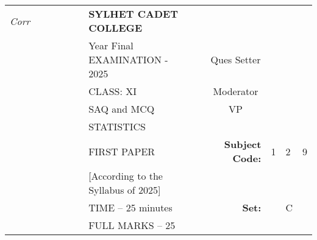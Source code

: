 \documentclass[12pt]{exam}
\begin{document}
\begin{table}[]
\begin{tabular}{lllllllllrlll}
\textit{Corr} &  &  &  &  &  & \textbf{SYLHET CADET COLLEGE}       &  &                       & \multicolumn{1}{l}{}                        &                        &                        &                        \\ \cline{10-13} 
       &  &  &  &  &  & Year Final EXAMINATION - 2025             &  & \multicolumn{1}{l|}{} & \multicolumn{1}{c|}{Ques Setter}            & \multicolumn{3}{l|}{}                                                    \\ \cline{10-13} 
       &  &  &  &  &  & CLASS: XI                          &  & \multicolumn{1}{l|}{} & \multicolumn{1}{c|}{Moderator}              & \multicolumn{3}{l|}{}                                                    \\ \cline{10-13} 
       &  &  &  &  &  & SAQ and MCQ           &  & \multicolumn{1}{l|}{} & \multicolumn{1}{c|}{VP}                     & \multicolumn{3}{l|}{}                                                    \\ \cline{10-13} 
       &  &  &  &  &  & STATISTICS                          &  &                       &                                             &                        &                        &                        \\ \cline{11-13} 
       &  &  &  &  &  & FIRST PAPER                        &  &                       & \multicolumn{1}{r|}{\textbf{Subject Code:}} & \multicolumn{1}{l|}{1} & \multicolumn{1}{l|}{2} & \multicolumn{1}{l|}{9} \\ \cline{11-13} 
       &  &  &  &  &  & [According to the Syllabus of 2025] &  &                       &                                             &                        &                        &                        \\ \cline{12-12}
       &  &  &  &  &  & TIME – 25 minutes                   &  &                       & \textbf{Set:}                               & \multicolumn{1}{l|}{}  & \multicolumn{1}{l|}{C} &                        \\ \cline{12-12}
       &  &  &  &  &  & FULL MARKS – 25                     &  &                       & \multicolumn{1}{l}{}                        &                        &                        &                       
\end{tabular}
\end{table}
\end{document}
